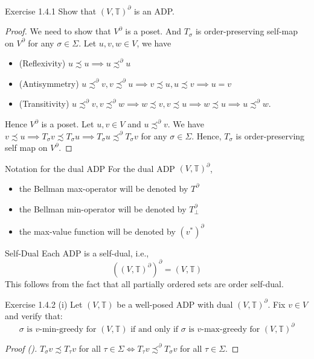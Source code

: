 \documentclass[aspectratio=169]{beamer} %
\begin{document}
\begin{frame}{Exercise 1.4.1}
Show that $(V,\mathbb{T})^\partial$ is an ADP.
\begin{proof}
    We need to show that $V^\partial$ is a poset. And $T_\sigma$ is order-preserving self-map on $V^\partial$ for any $\sigma\in\Sigma$. Let $u,v,w\in V$, we have
    \begin{itemize}
        \item (Reflexivity) $u\precsim u\implies u\precsim^\partial u$
        \item (Antisymmetry) $u\precsim^\partial v, v\precsim^\partial u\implies v\precsim u, u\precsim v\implies u=v $
        \item (Transitivity) $u\precsim^\partial v, v\precsim^\partial w \implies w\precsim v, v\precsim u\implies w\precsim u\implies u\precsim^\partial w$.
    \end{itemize}
    Hence $V^\partial$ is a poset. Let $u,v\in V$ and $u\precsim^\partial v$. We have $v\precsim u\implies T_\sigma v\precsim T_\sigma u\implies T_\sigma u\precsim^\partial T_\sigma v$ for any $\sigma \in\Sigma$. Hence, $T_\sigma$ is order-preserving self map on $V^\partial$.
\end{proof}
    
\end{frame}

\begin{frame}{Notation for the dual ADP}
For the dual ADP $(V,\mathbb{T})^\partial$, 
\begin{itemize}
    \item the Bellman max-operator will be denoted by $T^\partial$
    \item the Bellman min-operator will be denoted by $T_\perp^\partial$
    \item the max-value function will be denoted by $(v^*)^\partial$
\end{itemize}
\end{frame}
\begin{frame}{Self-Dual}
    Each ADP is a self-dual, i.e.,
    $$
    ((V,\mathbb{T})^\partial)^\partial = (V,\mathbb{T})
    $$
    This follows from the fact that all partially ordered sets are order self-dual.
\end{frame}

\begin{frame}{Exercise 1.4.2 (i)}
    Let $(V,\mathbb{T})$ be a well-posed ADP with dual $(V,\mathbb{T})^\partial$. Fix $v\in V$ and verify that:
    $$
    \text{$\sigma$ is $v$-min-greedy for $(V,\mathbb{T})$ if and only if $\sigma$ is $v$-max-greedy for $(V,\mathbb{T})^\partial$}
    $$
    \begin{proof}[Proof (\iff)]
    $T_\sigma v\precsim T_\tau v$ for all $\tau\in\Sigma \iff T_\tau v\precsim^\partial T_\sigma v$ for all $\tau\in \Sigma$.
    \end{proof}
\end{frame}
\end{document}
